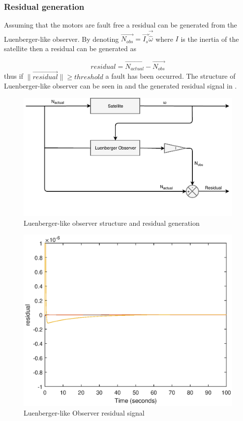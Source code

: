 \subsubsection{Residual generation}
 Assuming that the motors are fault free a residual can be generated from the Luenberger-like observer. By denoting $\vec{N_{obs}} =\vec{I_s}\vec{\dot{{\hat \omega}}}$ where $I$ is the inertia of the satellite then a residual can be generated as
 
 \begin{equation}
 residual = \vec{N_{actual}} - \vec{N_{obs}}
 \label{eq:residualObs}
 \end{equation}
 thus if $\lVert \vec{residual} \rVert \geq threshold$ a fault has been occurred. The structure of Luenberger-like observer can be seen in  and the generated residual signal in  . 
 \begin{figure}[H]
 	\centering
 	\includegraphics[width=0.7\linewidth]{figures/observerSimple}
 	\caption{Luenberger-like observer structure and residual generation}
 	\label{fig:obe}
 \end{figure}
 \label{sec:simpleObserveresidual}
\begin{figure}[H]
	\centering
	\includegraphics[width=0.7\linewidth]{figures/Observer_residual}
	\caption{Luenberger-like Observer residual signal }
	\label{fig:observerresidual}
\end{figure}
